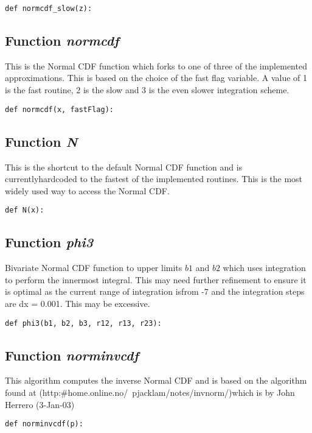 \documentclass[twoside,11pt]{book}
\begin{document}
\begin{lstlisting}
def normcdf_slow(z):
\end{lstlisting}

\subsection{Function {\it normcdf}}
This is the Normal CDF function which forks to one of three of the implemented approximations. This is based on the choice of the fast flag variable. A value of 1 is the fast routine, 2 is the slow and 3 is the even slower integration scheme. 

\begin{lstlisting}
def normcdf(x, fastFlag):
\end{lstlisting}

\subsection{Function {\it N}}
This is the shortcut to the default Normal CDF function and is currentlyhardcoded to the fastest of the implemented routines. This is the most widely used way to access the Normal CDF. 

\begin{lstlisting}
def N(x):
\end{lstlisting}

\subsection{Function {\it phi3}}
Bivariate Normal CDF function to upper limits $b1$ and $b2$ which uses integration to perform the innermost integral. This may need further refinement to ensure it is optimal as the current range of integration isfrom -7 and the integration steps are dx = 0.001. This may be excessive. 

\begin{lstlisting}
def phi3(b1, b2, b3, r12, r13, r23):
\end{lstlisting}

\subsection{Function {\it norminvcdf}}
This algorithm computes the inverse Normal CDF and is based on the algorithm found at (http:\#home.online.no/~pjacklam/notes/invnorm/)which is by John Herrero (3-Jan-03) 

\begin{lstlisting}
def norminvcdf(p):
\end{lstlisting}
\end{document}
